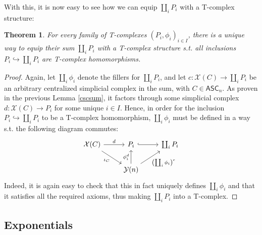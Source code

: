 \documentclass{article}
\newtheorem{theorem}{Theorem}[subsection]
\theoremstyle{remark}
\theoremstyle{definition}
\newcommand{\ASC}{\mathsf{ASC}}
\newcommand{\Y}{\mathcal Y}
\newcommand{\X}{\mathcal X}
\begin{document}
	With this, it is now easy to see how we can equip $\coprod_iP_i$ with a T-complex structure:
	\begin{theorem}
		For every family of T-complexes $(P_i,\phi_i)_{i\in I}$, there is a unique way to equip their sum $\coprod_iP_i$ with a T-complex structure s.t. all inclusions $P_i\hookrightarrow\coprod_iP_i$ are T-complex homomorphisms.
	\end{theorem}
	\begin{proof}
		Again, let $\coprod_i\phi_i$ denote the fillers for $\coprod_iP_i$, and let $c:\X(C)\to\coprod_iP_i$ be an arbitrary centralized simplicial complex in the sum, with $C\in\ASC_n$. As proven in the previous Lemma \ref{cscsum}, it factors through some simplicial complex $d:\X(C)\to P_i$ for some unique $i\in I$. Hence, in order for the inclusion $P_i\hookrightarrow\coprod_iP_i$ to be a T-complex homomorphism, $\coprod_i\phi_i$ must be defined in a way s.t. the following diagram commutes:
		\[\begin{tikzcd}
			\X(C)\arrow{r}{d}\arrow{dr}[swap]{\iota_C}&P_i\arrow[hook]{r}&\coprod_iP_i\\
			&\Y(n)\arrow{u}{\phi_i^d}\arrow{ur}[swap]{\left(\coprod_i\phi_i\right)^c}
		\end{tikzcd}\]
		Indeed, it is again easy to check that this in fact uniquely defines $\coprod_i\phi_i$ and that it satisfies all the required axioms, thus making $\coprod_iP_i$ into a T-complex.
	\end{proof}
	\subsection{Exponentials}
\end{document}
